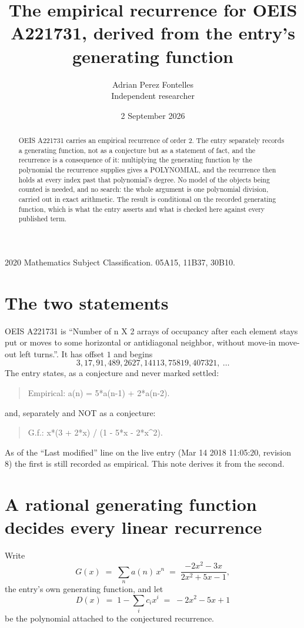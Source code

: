 \documentclass[11pt,a4paper]{article}
\title{The empirical recurrence for OEIS A221731, derived from the entry's generating function}
\author{Adrian Perez Fontelles\\ \small Independent researcher}
\date{2 September 2026}
\theoremstyle{plain}
\theoremstyle{definition}
\begin{document}
\maketitle

\begin{abstract}
OEIS A221731 carries an empirical recurrence of order $2$. The entry separately records a
generating function, not as a conjecture but as a statement of fact, and the recurrence is a
consequence of it: multiplying the generating function by the polynomial the recurrence
supplies gives a POLYNOMIAL, and the recurrence then holds at every index past that
polynomial's degree. No model of the objects being counted is needed, and no search: the
whole argument is one polynomial division, carried out in exact arithmetic. The result is
conditional on the recorded generating function, which is what the entry asserts and what is
checked here against every published term.
\end{abstract}

\noindent\small 2020 Mathematics Subject Classification. 05A15, 11B37, 30B10.\normalsize

\section{The two statements}

OEIS A221731 is ``Number of n X 2 arrays of occupancy after each element stays put or moves to some horizontal or antidiagonal neighbor, without move-in move-out left turns.''. It has offset $1$ and begins
\[
3, 17, 91, 489, 2627, 14113, 75819, 407321,\ \dots
\]
The entry states, as a conjecture and never marked settled:
\begin{quote}
Empirical: a(n) = 5*a(n-1) + 2*a(n-2).
\end{quote}
and, separately and NOT as a conjecture:
\begin{quote}
G.f.: x*(3 + 2*x) / (1 - 5*x - 2*x\^{}2).
\end{quote}
As of the ``Last modified'' line on the live entry (Mar 14 2018 11:05:20, revision 8) the first is still
recorded as empirical. This note derives it from the second.

\section{A rational generating function decides every linear recurrence}

Write
\[
G(x)\;=\;\sum_{n}a(n)\,x^{n}\;=\;\frac{- 2 x^{2} - 3 x}{2 x^{2} + 5 x - 1},
\]
the entry's own generating function, and let
\[
D(x)\;=\;1-\sum_i c_i x^{i}\;=\;- 2 x^{2} - 5 x + 1
\]
be the polynomial attached to the conjectured recurrence.
\end{document}
